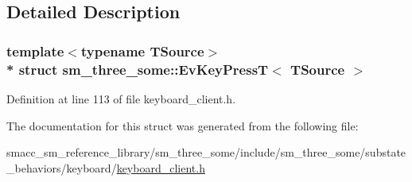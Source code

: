 \subsection{Detailed Description}
\subsubsection*{template$<$typename T\+Source$>$\\*
struct sm\+\_\+three\+\_\+some\+::\+Ev\+Key\+Press\+T$<$ T\+Source $>$}



Definition at line 113 of file keyboard\+\_\+client.\+h.



The documentation for this struct was generated from the following file\+:\begin{DoxyCompactItemize}
\item 
smacc\+\_\+sm\+\_\+reference\+\_\+library/sm\+\_\+three\+\_\+some/include/sm\+\_\+three\+\_\+some/substate\+\_\+behaviors/keyboard/\hyperlink{keyboard__client_8h}{keyboard\+\_\+client.\+h}\end{DoxyCompactItemize}
